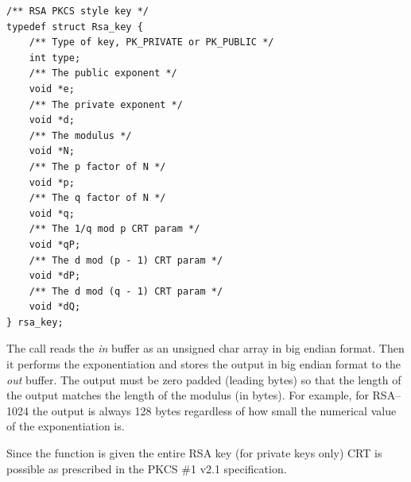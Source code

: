 \documentclass[synpaper]{book}
\begin{document}
\begin{verbatim}
/** RSA PKCS style key */
typedef struct Rsa_key {
    /** Type of key, PK_PRIVATE or PK_PUBLIC */
    int type;
    /** The public exponent */
    void *e;
    /** The private exponent */
    void *d;
    /** The modulus */
    void *N;
    /** The p factor of N */
    void *p;
    /** The q factor of N */
    void *q;
    /** The 1/q mod p CRT param */
    void *qP;
    /** The d mod (p - 1) CRT param */
    void *dP;
    /** The d mod (q - 1) CRT param */
    void *dQ;
} rsa_key;
\end{verbatim}

The call reads the \textit{in} buffer as an unsigned char array in big endian format.  Then it performs the exponentiation and stores the output in big endian format
to the \textit{out} buffer.  The output must be zero padded (leading bytes) so that the length of the output matches the length of the modulus (in bytes).  For example,
for RSA--1024 the output is always 128 bytes regardless of how small the numerical value of the exponentiation is.

Since the function is given the entire RSA key (for private keys only) CRT is possible as prescribed in the PKCS \#1 v2.1 specification.

\newpage
{}

\end{document}
